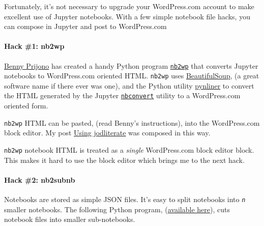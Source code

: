 Fortunately, it's not necessary to upgrade your WordPress.com account to
make excellent use of Jupyter notebooks. With a few simple notebook file
hacks, you can compose in Jupyter and post to WordPress.com

    \hypertarget{hack-1-nb2wp}{%
\paragraph{Hack \#1: nb2wp}\label{hack-1-nb2wp}}

    \href{https://github.com/bennylp}{Benny Prijono} has created a handy
Python program \href{https://github.com/bennylp/nb2wp}{\texttt{nb2wp}}
that converts Jupyter notebooks to WordPress.com oriented HTML.
\texttt{nb2wp} uses
\href{https://pypi.org/project/beautifulsoup4/}{BeautifulSoup}, (a great
software name if there ever was one), and the Python utility
\href{https://pythonhosted.org/pynliner/}{pynliner} to convert the HTML
generated by the Jupyter
\href{https://anaconda.org/anaconda/nbconvert}{\texttt{nbconvert}}
utility to a WordPress.com oriented form.

\texttt{nb2wp} HTML can be pasted, (read Benny's instructions), into the
WordPress.com block editor. My post
\href{https://analyzethedatanotthedrivel.org/2020/05/25/using-jodliterate/}{Using
jodliterate} was composed in this way.

\texttt{nb2wp} notebook HTML is treated as a \emph{single} WordPress.com
block editor block. This makes it hard to use the block editor which
brings me to the next hack.

    \hypertarget{hack-2-nb2subnb}{%
\paragraph{Hack \#2: nb2subnb}\label{hack-2-nb2subnb}}

    Notebooks are stored as simple JSON files. It's easy to split notebooks
into \emph{\texttt{n}} smaller notebooks. The following Python program,
(\href{https://github.com/bakerjd99/Analyze-the-Data-not-the-Drivel/blob/master/bluts/nb2wput.py}{available
here}), cuts notebook files into smaller sub-notebooks.

